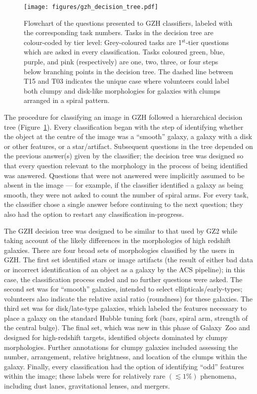 \documentclass[a4paper,fleqn,usenatbib]{mnras}
\begin{document}
\begin{figure}
\center
\texttt{[image: figures/gzh\_decision\_tree.pdf]}
\caption{Flowchart of the questions presented to GZH classifiers, labeled with
the corresponding task numbers. Tasks in the decision tree are colour-coded by
tier level: Grey-coloured tasks are 1$^\mathrm{st}$-tier questions which are
asked in every classification. Tasks coloured green, blue, purple, and pink
(respectively) are one, two, three, or four steps below branching points in the
decision tree. The dashed line between T15 and T03 indicates the unique case
where volunteers could label both clumpy and disk-like morphologies for
galaxies with clumps arranged in a spiral pattern.}
\label{fig:decisiontree}
\end{figure}

The procedure for classifying an image in GZH followed a hierarchical decision
tree (Figure~\ref{fig:decisiontree}). Every classification began with the step of
identifying whether the object at the centre of the image was a ``smooth'' galaxy,
a galaxy with a disk or other features, or a star/artifact. Subsequent
questions in the tree depended on the previous answer(s) given by the classifier; the
decision tree was designed so that every question relevant to
the morphology in the process of being identified was answered. Questions that were not
answered were implicitly assumed to be absent in the image --- for example, if
the classifier identified a galaxy as being smooth, they were not asked to count the
number of spiral arms. For every task, the classifier chose a single answer before
continuing to the next question; they also had the option to restart any
classification in-progress. 

The GZH decision tree was designed to be similar to that used by GZ2 while
taking account of the likely differences in the morphologies of high redshift galaxies. There are four
broad sets of morphologies classified by the users in GZH.  The first set
identified stars or image artifacts (the result of either bad data or incorrect
identification of an object as a galaxy by the ACS pipeline); in this case, the
classification process ended and no further questions were asked. The second
set was for ``smooth'' galaxies, intended to select ellipticals/early-types;
volunteers also indicate the relative axial ratio (roundness) for these
galaxies. The third set was for disk/late-type galaxies, which labeled the
features necessary to place a galaxy on the standard Hubble tuning fork (bars,
spiral arm, strength of the central bulge). The final set, which was new in
this phase of Galaxy~Zoo and designed for high-redshift targets, identified
objects dominated by clumpy morphologies. Further annotations for clumpy
galaxies included assessing the number, arrangement, relative brightness, and
location of the clumps within the galaxy. Finally, every classification 
had the option of identifying ``odd'' features within the image; these
labels were for relatively rare $(\lesssim1\%)$ phenomena, including dust
lanes, gravitational lenses, and mergers. 
\end{document}
